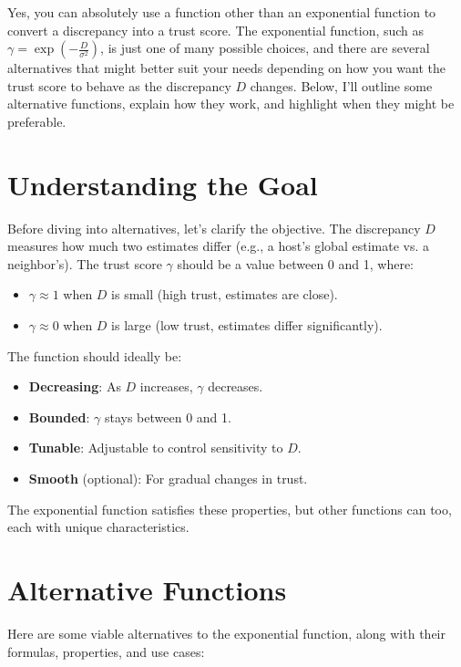 \documentclass{article}
\begin{document}
Yes, you can absolutely use a function other than an exponential function to convert a discrepancy into a trust score. The exponential function, such as \(\gamma = \exp\left(-\frac{D}{\sigma^2}\right)\), is just one of many possible choices, and there are several alternatives that might better suit your needs depending on how you want the trust score to behave as the discrepancy \(D\) changes. Below, I'll outline some alternative functions, explain how they work, and highlight when they might be preferable.

\section*{Understanding the Goal}
Before diving into alternatives, let's clarify the objective. The discrepancy \(D\) measures how much two estimates differ (e.g., a host's global estimate vs. a neighbor's). The trust score \(\gamma\) should be a value between 0 and 1, where:
\begin{itemize}
    \item \(\gamma \approx 1\) when \(D\) is small (high trust, estimates are close).
    \item \(\gamma \approx 0\) when \(D\) is large (low trust, estimates differ significantly).
\end{itemize}

The function should ideally be:
\begin{itemize}
    \item \textbf{Decreasing}: As \(D\) increases, \(\gamma\) decreases.
    \item \textbf{Bounded}: \(\gamma\) stays between 0 and 1.
    \item \textbf{Tunable}: Adjustable to control sensitivity to \(D\).
    \item \textbf{Smooth} (optional): For gradual changes in trust.
\end{itemize}

The exponential function satisfies these properties, but other functions can too, each with unique characteristics.

\section*{Alternative Functions}

Here are some viable alternatives to the exponential function, along with their formulas, properties, and use cases:
\end{document}
